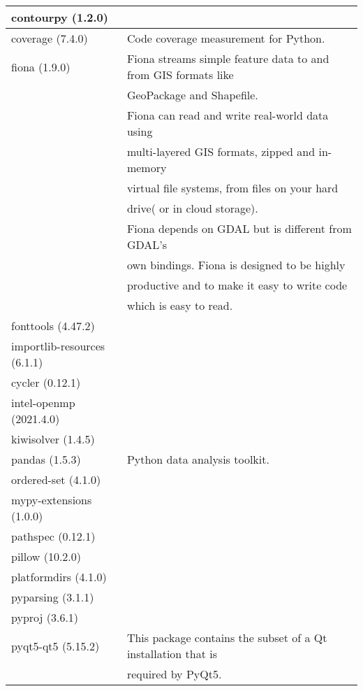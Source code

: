 \begin{longtable}{|l|l|}
	contourpy (1.2.0)             &                 \\ \hline
	coverage (7.4.0)              & Code coverage measurement for Python. \\ \hline
	fiona (1.9.0)                 & Fiona streams simple feature data to and from GIS formats like 
	\\ & GeoPackage and Shapefile.
	\\ & Fiona can read and write real-world data using 
	\\ & multi-layered GIS formats, zipped and in-memory 
	\\ & virtual file systems, from files on your hard 
	\\ & drive( or in cloud storage).	
	\\ & Fiona depends on GDAL but is different from GDAL’s
	\\ &  own bindings. Fiona is designed to be highly 
	\\ & productive and to make it easy to write code 
	\\ & which is easy to read. \\ \hline
	fonttools (4.47.2)            &                 \\ \hline
	importlib-resources (6.1.1)   &                 \\ \hline
	cycler (0.12.1)               &                 \\ \hline
	intel-openmp (2021.4.0)       &                 \\ \hline
	kiwisolver (1.4.5)            &                 \\ \hline
	pandas (1.5.3)                & Python data analysis toolkit. \\ \hline
	ordered-set (4.1.0)           &                 \\ \hline
	mypy-extensions (1.0.0)       &                 \\ \hline
	pathspec (0.12.1)             &                 \\ \hline
	pillow (10.2.0)               &                 \\ \hline
	platformdirs (4.1.0)          &                 \\ \hline
	pyparsing (3.1.1)             &                 \\ \hline
	pyproj (3.6.1)                &                 \\ \hline
	pyqt5-qt5 (5.15.2)            & This package contains the subset of a Qt installation that is
	\\ & required by PyQt5. \\ \hline

\end{longtable}
